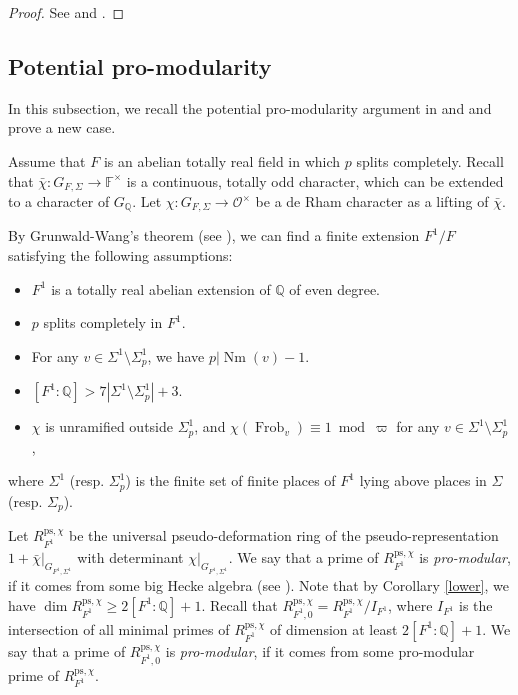 \documentclass[a4paper, 12pt]{amsart}
\def\ps{\mathrm{ps}}
\newcommand{\F}{\mathbb{F}}
\newcommand{\Q}{\mathbb{Q}}
\newcommand{\cO}{\mathcal{O}}
\begin{document}
    \begin{proof}
    	See \cite[Theorem 7.1.1]{pan2022fontaine} and \cite[Theorem 5.1.1]{Zhang:2024aa}.
    \end{proof}
    
    \subsection{Potential pro-modularity}\label{potential pro-modular}
    In this subsection, we recall the potential pro-modularity argument in \cite{Zhang:2024aa} and \cite{Zhang:2024ab} and prove a new case.
    
    Assume that $F$ is an abelian totally real field in which $p$ splits completely. Recall that $\bar{\chi}: G_{F, \Sigma} \to \F^\times$ is a continuous, totally odd character, which can be extended to a character of $G_\Q$. Let $\chi : G_{F, \Sigma} \to \cO^\times$ be a de Rham character as a lifting of $\bar{\chi}$.
    
    By Grunwald-Wang's theorem (see \cite[Theorem 5, page 80]{artin}), we can find a finite extension $F^1/F$ satisfying the following assumptions:
    	\begin{itemize}
    	\item $F^1$ is a totally real abelian extension of $\mathbb{Q}$ of even degree.
    	\item $p$ splits completely in $F^1$.
    	\item  For any $v \in \Sigma^1 \setminus \Sigma^1_p$, we have $p| \operatorname{Nm}(v)-1$.
    	\item $[F^1:\mathbb{Q}]>7|\Sigma^1 \setminus \Sigma^1_p|+3$.
    	\item  $\chi$ is unramified outside $ \Sigma^1_p$, and $\chi(\operatorname{Frob}_v) \equiv 1~\operatorname{mod}~\varpi$ for any $v \in \Sigma^1 \setminus \Sigma^1_p$,
    \end{itemize}
    where $ \Sigma^1$ (resp. $\Sigma^1_p $) is the finite set of finite places of $F^1$ lying above places in $\Sigma$ (resp. $\Sigma_p $).
    
    Let $R_{F^1}^{\ps, \chi}$ be the universal pseudo-deformation ring of the pseudo-representation $1+\bar{\chi}|_{G_{F^1, \Sigma^1}}$ with determinant $\chi|_{G_{F^1, \Sigma^1}}$. We say that a prime of $R_{F^1}^{\ps, \chi}$ is \textit{pro-modular}, if it comes from some big Hecke algebra (see \cite[Definition 4.1.3]{Zhang:2024aa}). Note that by Corollary \ref{lower}, we have $\dim R_{F^1}^{\ps, \chi} \ge 2[F^1:\Q]+1 $. Recall that $R_{F^1,0}^{\ps, \chi}= R_{F^1}^{\ps, \chi}/I_{F^1}$, where $ I_{F^1}$ is the intersection of all minimal primes of $R_{F^1}^{\ps, \chi} $ of dimension at least $2[F^1:\Q]+1 $. We say that a prime of $R_{F^1,0}^{\ps, \chi}$ is \textit{pro-modular}, if it comes from some pro-modular prime of $R_{F^1}^{\ps, \chi}$.
    
\end{document}
